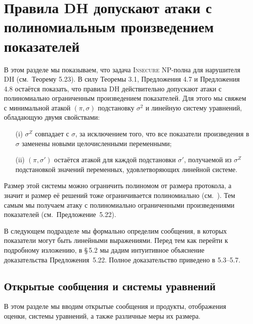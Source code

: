 \section{Правила DH допускают атаки с полиномиальным произведением показателей}

В этом разделе мы показываем, что задача \textsc{Insecure} NP-полна для нарушителя DH (см.~Теорему 5.23). В силу Теоремы 3.1, Предложения 4.7 и Предложения 4.8 остаётся показать, что правила DH действительно допускают атаки
с полиномиально ограниченным произведением показателей.
Для этого мы свяжем с минимальной атакой $(\pi,\sigma)$
подстановку $\sigma^{2}$ и линейную систему уравнений,
обладающую двумя свойствами:

\begin{enumerate}\itemsep0pt
\item[(i)] $\sigma^{Z}$ совпадает с $\sigma$, за исключением того,
      что все показатели произведения в $\sigma$
      заменены новыми целочисленными переменными;
\item[(ii)] $(\pi,\sigma')$ остаётся атакой для каждой подстановки $\sigma'$,  
      получаемой из $\sigma^{Z}$ подстановкой значений переменных,
      удовлетворяющих линейной системе.
\end{enumerate}
Размер этой системы можно ограничить полиномом от размера протокола,
а значит и размер её решений тоже ограничивается полиномиально
(см.\ \cite{Bockmayr2001}).
Тем самым мы получаем атаку с полиномиально
ограниченными произведениями показателей
(см.\ Предложение~5.22).

В следующем подразделе мы формально определим сообщения,
в которых показатели могут быть линейными выражениями.
Перед тем как перейти к подробному изложению,
в §\,5.2 мы дадим интуитивное объяснение доказательства
Предложения~5.22.
Полное доказательство приведено в 5.3–5.7.

\subsection{Открытые сообщения и системы уравнений}

В этом разделе мы вводим открытые сообщения и продукты, отображения
оценки, системы уравнений, а также различные меры их размера.

